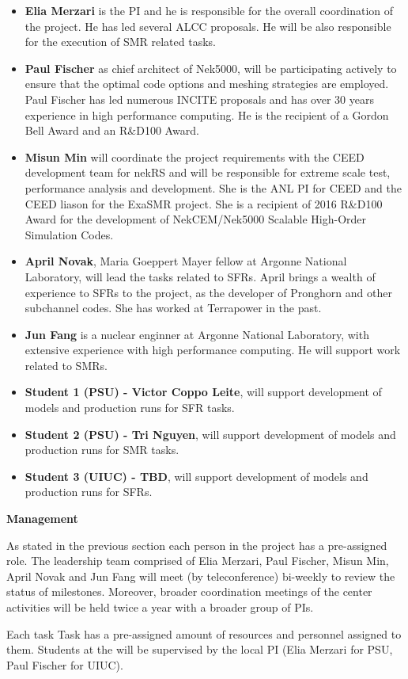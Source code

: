 \documentclass[11pt,letterpaper,english]{article}
\begin{document}
\begin{flushleft}
\vspace{-.15in}
\begin{itemize}
\item \textbf{Elia Merzari} is the PI and he is responsible for the overall coordination of the project. He has led several ALCC proposals. He will be also responsible for the execution of SMR related tasks.
\item \textbf{Paul Fischer} as chief architect of Nek5000, will  be  participating actively to ensure that the optimal code options and meshing strategies are employed. Paul Fischer has led numerous INCITE proposals and has over 30 years experience in high performance computing. He is the recipient of a Gordon Bell Award and an R\&D100 Award.
\item \textbf{Misun Min} will coordinate the project requirements with the CEED development team for nekRS and will be responsible for extreme scale test, performance analysis and development.
She is the ANL PI for CEED and the CEED liason for the ExaSMR project. She is a recipient of 2016 R\&D100 Award for the development of NekCEM/Nek5000 Scalable High-Order Simulation Codes.
\item \textbf{April Novak}, Maria Goeppert Mayer fellow at Argonne National Laboratory, will lead the tasks related to SFRs. April brings a wealth of experience to SFRs to the project, as the developer of Pronghorn and other subchannel codes. She has worked at Terrapower in the past.
\item \textbf{Jun Fang} is a nuclear enginner at Argonne National Laboratory, with extensive experience with high performance computing.  He will support work related to SMRs.
\item \textbf{Student 1 (PSU) - Victor Coppo Leite}, will support development of models and production runs for SFR tasks.
\item \textbf{Student 2 (PSU) - Tri Nguyen}, will support development of models and production runs for SMR tasks.
\item \textbf{Student 3 (UIUC) - TBD}, will support development of models and production runs for SFRs.
\end{itemize}

{\noindent \bf  {Management}}

As stated in the previous section each person in the project has a pre-assigned role. The leadership team comprised of Elia Merzari, Paul Fischer, Misun Min, April Novak and Jun Fang will meet (by teleconference) bi-weekly to review the status of milestones.  Moreover, broader coordination meetings of the center activities will be held twice a year with a broader group of PIs.

Each task Task has a pre-assigned amount of resources and personnel assigned to them. Students at the  will be supervised by the local PI (Elia Merzari for PSU, Paul Fischer for UIUC).

\end{flushleft}
\end{document}
